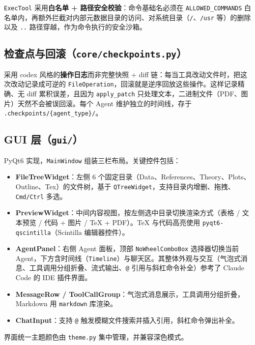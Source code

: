 \documentclass[a4paper,11pt]{article}
\begin{document}
\texttt{ExecTool} 采用\textbf{白名单 + 路径安全校验}：命令基础名必须在 \texttt{ALLOWED\_COMMANDS} 白名单内，再额外拦截对内部元数据目录的访问、对系统目录（\texttt{/}、\texttt{/usr} 等）的删除以及 \texttt{..} 路径穿越，作为命令执行的安全沙箱。

\subsection{检查点与回滚（\texttt{core/checkpoints.py}）}

采用 codex\cite{codex} 风格的\textbf{操作日志}而非完整快照 + diff 链：每当工具改动文件时，把这次改动记录成可逆的 \texttt{FileOperation}，回滚就是逆序回放这些操作。这样记录精确、无 diff 累积误差，且因为 \texttt{apply\_patch} 只处理文本，二进制文件（PDF、图片）天然不会被误回滚。每个 Agent 维护独立的时间线，存于 \texttt{.checkpoints/\{agent\_type\}/}。

\subsection{GUI 层（\texttt{gui/}）}

PyQt6 实现，\texttt{MainWindow} 组装三栏布局。关键控件包括：

\begin{itemize}[leftmargin=1.4em,itemsep=2pt]
  \item \textbf{FileTreeWidget}：左侧 6 个固定目录（Data、References、Theory、Plots、Outline、Tex）的文件树，基于 \texttt{QTreeWidget}，支持目录内增删、拖拽、\texttt{Cmd/Ctrl} 多选。
  \item \textbf{PreviewWidget}：中间内容视图，按左侧选中目录切换渲染方式（表格 / 文本预览 / 代码 + 图片 / TeX + PDF）。TeX 与代码高亮使用 \texttt{pyqt6-qscintilla}（Scintilla 编辑器控件）。
  \item \textbf{AgentPanel}：右侧 Agent 面板，顶部 \texttt{NoWheelComboBox} 选择器切换当前 Agent，下方含时间线（\texttt{Timeline}）与聊天区。其整体外观与交互（气泡式消息、工具调用分组折叠、流式输出、\texttt{@} 引用与斜杠命令补全）参考了 Claude Code\cite{claudecode} 的 IDE 插件界面。
  \item \textbf{MessageRow / ToolCallGroup}：气泡式消息展示，工具调用分组折叠，Markdown 用 \texttt{markdown} 库渲染。
  \item \textbf{ChatInput}：支持 \texttt{@} 触发模糊文件搜索并插入引用，斜杠命令弹出补全。
\end{itemize}

界面统一主题颜色由 \texttt{theme.py} 集中管理，并兼容深色模式。
\end{document}
